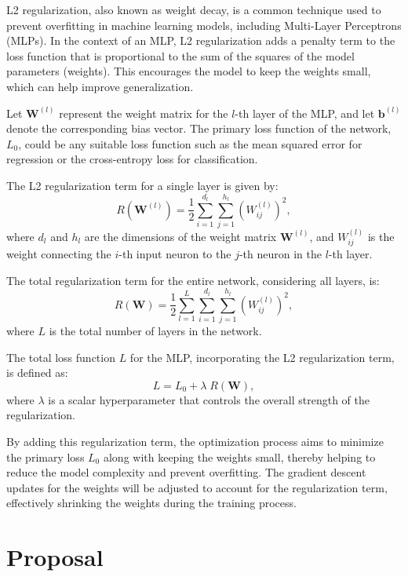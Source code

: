 L2 regularization, also known as weight decay, is a common technique used to prevent overfitting in machine learning models, including Multi-Layer Perceptrons (MLPs). In the context of an MLP, L2 regularization adds a penalty term to the loss function that is proportional to the sum of the squares of the model parameters (weights). This encourages the model to keep the weights small, which can help improve generalization.

Let $\mathbf{W}^{(l)}$ represent the weight matrix for the $l$-th layer of the MLP, and let $\mathbf{b}^{(l)}$ denote the corresponding bias vector. The primary loss function of the network, $L_0$, could be any suitable loss function such as the mean squared error for regression or the cross-entropy loss for classification.

The L2 regularization term for a single layer is given by:
\begin{equation}
R(\mathbf{W}^{(l)}) = \frac{1}{2} \sum_{i=1}^{d_l} \sum_{j=1}^{h_l} \left( W^{(l)}_{ij} \right)^2,
\end{equation}
where $d_l$ and $h_l$ are the dimensions of the weight matrix $\mathbf{W}^{(l)}$, and $W^{(l)}_{ij}$ is the weight connecting the $i$-th input neuron to the $j$-th neuron in the $l$-th layer.

The total regularization term for the entire network, considering all layers, is:
\begin{equation}
R(\mathbf{W}) = \frac{1}{2} \sum_{l=1}^{L} \sum_{i=1}^{d_l} \sum_{j=1}^{h_l} \left( W^{(l)}_{ij} \right)^2,
\end{equation}
where $L$ is the total number of layers in the network.

The total loss function $L$ for the MLP, incorporating the L2 regularization term, is defined as:
\begin{equation}
L = L_0 + \lambda \; R(\mathbf{W}),
\end{equation}
where $\lambda$ is a scalar hyperparameter that controls the overall strength of the regularization.

By adding this regularization term, the optimization process aims to minimize the primary loss $L_0$ along with keeping the weights small, thereby helping to reduce the model complexity and prevent overfitting. The gradient descent updates for the weights will be adjusted to account for the regularization term, effectively shrinking the weights during the training process.


\section{Proposal}

